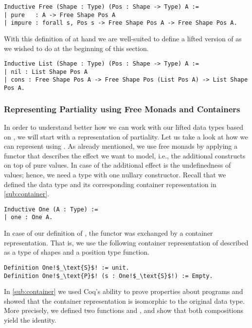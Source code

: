 \begin{verbatim}
Inductive Free (Shape : Type) (Pos : Shape -> Type) A :=
| pure   : A -> Free Shape Pos A
| impure : forall s, Pos s -> Free Shape Pos A -> Free Shape Pos A.
\end{verbatim}

With this definition of  at hand we are well-suited to define a lifted version of  as we wished to do at the beginning of this section.

\begin{verbatim}
Inductive List (Shape : Type) (Pos : Shape -> Type) A :=
| nil : List Shape Pos A
| cons : Free Shape Pos A -> Free Shape Pos (List Pos A) -> List Shape Pos A.
\end{verbatim}

\subsubsection{Representing Partiality using Free Monads and Containers}
\label{subsub:partiality_container}

In order to understand better how we can work with our lifted data types based on , we will start with a representation of partiality.
Let us take a look at how we can represent  using .
As already mentioned, we use free monads by applying a functor  that describes the effect we want to model, i.e., the additional constructs on top of pure values.
In case of  the additional effect is the undefinedness of values; hence, we need a type with one nullary constructor.
Recall that we defined the data type  and its corresponding container representation in \autoref{sub:container}.

\begin{verbatim}
Inductive One (A : Type) :=
| one : One A.
\end{verbatim}

In case of our definition of , the functor was exchanged by a container representation.
That is, we use the following container representation of  described as a type of shapes and a position type function.

\begin{verbatim}
Definition One!$_\text{S}$! := unit.
Definition One!$_\text{P}$! (s : One!$_\text{S}$!) := Empty.
\end{verbatim}

In \autoref{sub:container} we used Coq's ability to prove properties about programs and showed that the container representation is isomorphic to the original data type.
More precisely, we defined two functions  and , and show that both compositions yield the identity.

